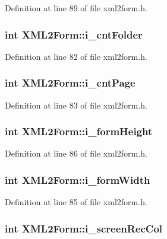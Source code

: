 Definition at line 89 of file xml2form.h.

\hypertarget{classXML2Form_a7d4f92c44bd1ac3f9a8aa31c8081f077}{
\subsubsection[{i\_\-cntFolder}]{\setlength{\rightskip}{0pt plus 5cm}int {\bf XML2Form::i\_\-cntFolder}}}
\label{classXML2Form_a7d4f92c44bd1ac3f9a8aa31c8081f077}


Definition at line 82 of file xml2form.h.

\hypertarget{classXML2Form_a5053e99259b0e7720ce7e9ad5ba397f8}{
\subsubsection[{i\_\-cntPage}]{\setlength{\rightskip}{0pt plus 5cm}int {\bf XML2Form::i\_\-cntPage}}}
\label{classXML2Form_a5053e99259b0e7720ce7e9ad5ba397f8}


Definition at line 83 of file xml2form.h.

\hypertarget{classXML2Form_a9ec68b9ec9319af60841934e2f9dd132}{
\subsubsection[{i\_\-formHeight}]{\setlength{\rightskip}{0pt plus 5cm}int {\bf XML2Form::i\_\-formHeight}}}
\label{classXML2Form_a9ec68b9ec9319af60841934e2f9dd132}


Definition at line 86 of file xml2form.h.

\hypertarget{classXML2Form_a66eb7e8e2ca2f84f01e7175a518679a9}{
\subsubsection[{i\_\-formWidth}]{\setlength{\rightskip}{0pt plus 5cm}int {\bf XML2Form::i\_\-formWidth}}}
\label{classXML2Form_a66eb7e8e2ca2f84f01e7175a518679a9}


Definition at line 85 of file xml2form.h.

\hypertarget{classXML2Form_ac6c302b110a9608d7f607199a22d8a7b}{
\subsubsection[{i\_\-screenRecCol}]{\setlength{\rightskip}{0pt plus 5cm}int {\bf XML2Form::i\_\-screenRecCol}}}
\label{classXML2Form_ac6c302b110a9608d7f607199a22d8a7b}


